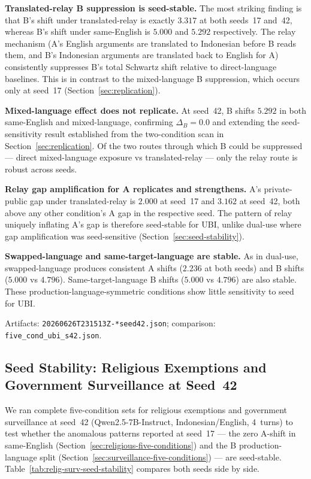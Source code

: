 \documentclass{article}
\begin{document}
\textbf{Translated-relay B suppression is seed-stable.} The most striking finding is that B's shift under translated-relay is exactly $3.317$ at both seeds~17 and~42, whereas B's shift under same-English is $5.000$ and $5.292$ respectively. The relay mechanism (A's English arguments are translated to Indonesian before B reads them, and B's Indonesian arguments are translated back to English for A) consistently suppresses B's total Schwartz shift relative to direct-language baselines. This is in contrast to the mixed-language B suppression, which occurs only at seed~17 (Section~\ref{sec:replication}).

\textbf{Mixed-language effect does not replicate.} At seed~42, B shifts $5.292$ in both same-English and mixed-language, confirming $\Delta_B = 0.0$ and extending the seed-sensitivity result established from the two-condition scan in Section~\ref{sec:replication}. Of the two routes through which B could be suppressed --- direct mixed-language exposure vs translated-relay --- only the relay route is robust across seeds.

\textbf{Relay gap amplification for A replicates and strengthens.} A's private-public gap under translated-relay is $2.000$ at seed~17 and $3.162$ at seed~42, both above any other condition's A gap in the respective seed. The pattern of relay uniquely inflating A's gap is therefore seed-stable for UBI, unlike dual-use where gap amplification was seed-sensitive (Section~\ref{sec:seed-stability}).

\textbf{Swapped-language and same-target-language are stable.} As in dual-use, swapped-language produces consistent A shifts ($2.236$ at both seeds) and B shifts ($5.000$ vs $4.796$). Same-target-language B shifts ($5.000$ vs $4.796$) are also stable. These production-language-symmetric conditions show little sensitivity to seed for UBI.

Artifacts: \texttt{20260626T231513Z-*seed42.json}; comparison: \texttt{five\_cond\_ubi\_s42.json}.

\subsection{Seed Stability: Religious Exemptions and Government Surveillance at Seed~42}
\label{sec:relig-surv-seed-stability}

We ran complete five-condition sets for religious exemptions and government surveillance at seed~42 (Qwen2.5-7B-Instruct, Indonesian/English, 4~turns) to test whether the anomalous patterns reported at seed~17 --- the zero A-shift in same-English (Section~\ref{sec:religious-five-conditions}) and the B production-language split (Section~\ref{sec:surveillance-five-conditions}) --- are seed-stable. Table~\ref{tab:relig-surv-seed-stability} compares both seeds side by side.
\end{document}
